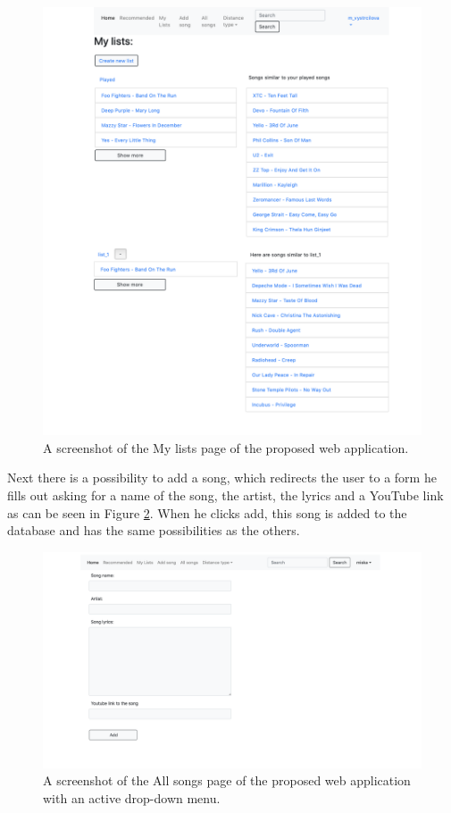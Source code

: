 \begin{figure}[H]
    \centering
	\includegraphics[width=1\linewidth]{./img/my_lists_page.png}
	\caption{A screenshot of the My lists page of the proposed web application.}
	\label{fig:my_lists_page}
\end{figure}
Next there is a possibility to add a song, which redirects the user to a form he fills out asking for a name of the song, the artist, the lyrics and a YouTube link as can be seen in Figure \ref{fig:add_song_form}. When he clicks add, this song is added to the database and has the same possibilities as the others.\\
\begin{figure}[H]
    \centering
	\includegraphics[width=1\linewidth]{./img/add_song_form.png}
	\caption{A screenshot of the All songs page of the proposed web application with an active drop-down menu.}
	\label{fig:add_song_form}
\end{figure}
